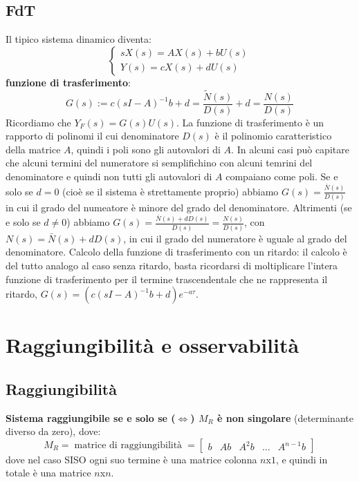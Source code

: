 \begin{landscape}
\begin{multicols*}{3}
    \subsection{FdT}
    Il tipico sistema dinamico diventa:
    \[
        \begin{cases}
            s X(s) = AX(s) + b U(s)\\
            Y(s) = cX(s) + d U(s)
        \end{cases}
    \]
    \textbf{funzione di trasferimento}:
    \[
        G(s) := c(sI-A)^{-1} b + d = \frac{\tilde{N}(s)}{D(s)} + d = \frac{N(s)}{D(s)}
    \]
    Ricordiamo che $Y_F(s) = G(s) U(s)$.\newline
    \newline
    La funzione di trasferimento è un rapporto di polinomi il cui denominatore $D(s)$ è il polinomio caratteristico della matrice $A$, quindi i poli sono gli autovalori di $A$. In alcuni casi può capitare che alcuni termini del numeratore si semplifichino con alcuni temrini del denominatore e quindi non tutti gli autovalori di $A$ compaiano come poli.\newline
    Se e solo se $d=0$ (cioè se il sistema è strettamente proprio) abbiamo $G(s) = \frac{\bar{N}(s)}{D(s)}$ in cui il grado del numeatore è minore del grado del denominatore.\newline
    Altrimenti (se e solo se $d\neq 0$) abbiamo $G(s) = \frac{\bar{N}(s) + dD(s)}{D(s)} = \frac{N(s)}{D(s)}$, con $N(s) = \bar{N}(s) +dD(s)$, in cui il grado del numeratore è uguale al grado del denominatore.\newline
    \newline
    Calcolo della funzione di trasferimento con un ritardo: il calcolo è del tutto analogo al caso senza ritardo, basta ricordarsi di moltiplicare l'intera funzione di trasferimento per il termine trascendentale che ne rappresenta il ritardo, $G(s) = (c(sI-A)^{-1} b + d) e^{-a \tau}$.
    \newpage\section{Raggiungibilità e osservabilità}
    \subsection{Raggiungibilità}
    \textbf{Sistema raggiungibile se e solo se ($\Leftrightarrow$) $M_R$ è non singolare} (determinante diverso da zero), dove:
    \[
        M_R= \;\text{matrice di raggiungibilità}\; =\left[\begin{matrix}
            b & Ab & A^2 b & \dots & A^{n-1}b
        \end{matrix}\right]
    \] 
    dove nel caso SISO ogni suo termine è una matrice colonna $n$x$1$, e quindi in totale è una matrice $n$x$n$.

\end{multicols*}
\end{landscape}
